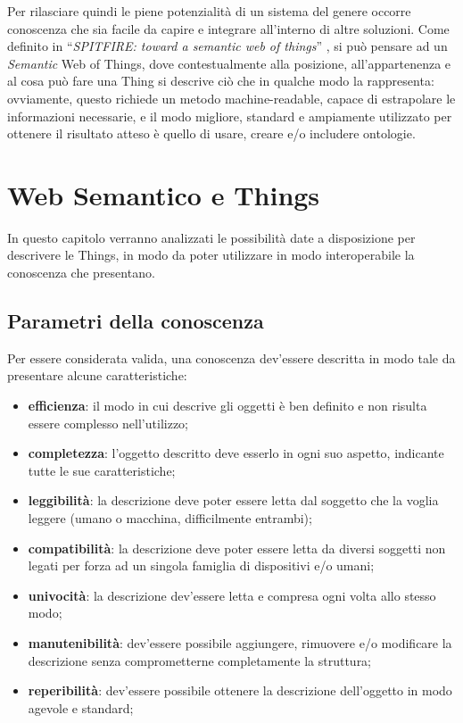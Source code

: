 \documentclass[12pt,a4paper,openright,oneside]{report}
\newcommand{\quotes}[1]{``#1''}
\begin{document}
Per rilasciare quindi le piene potenzialità di un sistema del genere occorre conoscenza che sia facile da capire e integrare all'interno di altre soluzioni. Come definito in \quotes{\textit{SPITFIRE: toward a semantic web of things}} \cite{semantic-wot}, si può pensare ad un \textit{Semantic} Web of Things, dove contestualmente alla posizione, all'appartenenza e al cosa può fare una Thing si descrive ciò che in qualche modo la rappresenta: ovviamente, questo richiede un metodo machine-readable, capace di estrapolare le informazioni necessarie, e il modo migliore, standard e ampiamente utilizzato per ottenere il risultato atteso è quello di usare, creare e/o includere ontologie.\\



\clearpage{\pagestyle{empty}\cleardoublepage}
\chapter{Web Semantico e Things}           %
\lhead[\fancyplain{}{\bfseries\thepage}]{\fancyplain{}{\bfseries\rightmark}}  
In questo capitolo verranno analizzati le possibilità date a disposizione per descrivere le Things, in modo da poter utilizzare in modo interoperabile la conoscenza che presentano.


\section{Parametri della conoscenza}
Per essere considerata valida, una conoscenza dev'essere descritta in modo tale da presentare alcune caratteristiche:

\begin{itemize}
	\item \textbf{efficienza}: il modo in cui descrive gli oggetti è ben definito e non risulta essere complesso nell'utilizzo;
	\item \textbf{completezza}: l'oggetto descritto deve esserlo in ogni suo aspetto, indicante tutte le sue caratteristiche;
	\item \textbf{leggibilità}: la descrizione deve poter essere letta dal soggetto che la voglia leggere (umano o macchina, difficilmente entrambi);
	\item \textbf{compatibilità}: la descrizione deve poter essere letta da diversi soggetti non legati per forza ad un singola famiglia di dispositivi e/o umani;
	\item \textbf{univocità}: la descrizione dev'essere letta e compresa ogni volta allo stesso modo;
	\item \textbf{manutenibilità}: dev'essere possibile aggiungere, rimuovere e/o modificare la descrizione senza comprometterne completamente la struttura;
	\item \textbf{reperibilità}: dev'essere possibile ottenere la descrizione dell'oggetto in modo agevole e standard;
\end{itemize}
\end{document}
